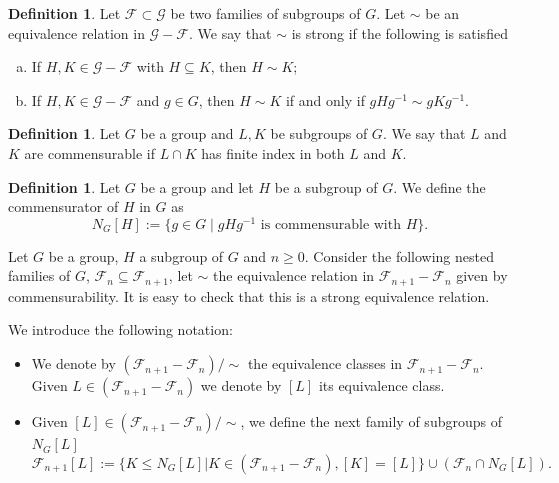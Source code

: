 \documentclass[a4paper,12pt,leqno]{amsart}
\theoremstyle{definition}
\newtheorem{definition}[theorem]{Definition}
\newcommand{\calF}{{\mathcal F}}
\newcommand{\calG}{{\mathcal G}}
\begin{document}
 



 
 \begin{definition}
     
 Let $\calF\subset\calG$ be two families of subgroups of $G$. Let $\sim$ be  an equivalence relation in $\calG-\calF$. We say that $\sim$ is strong  if the following is satisfied 
 
\begin{enumerate}[a)]
    \item If  $H, K \in \calG-\calF$ with $H\subseteq K$, then $H\sim K$;
    \item If $H, K \in \calG-\calF$ and $g\in G$, then $H\sim K$ if and only if $gHg^{-1} \sim gKg^{-1}$.
\end{enumerate}
 \end{definition}
 
 \begin{definition}
     Let $G$ be a group and $L, K$ be subgroups of $G$. We say that $L$ and $K$ are commensurable if $L\cap K$ has finite index in both $L$ and $K$.
 \end{definition}
 
\begin{definition}
Let $G$ be a group and let $H$ be a subgroup of $G$. We define the commensurator of $H$ in $G$ as  $$N_{G}[H]:=\{g\in G \mid gHg^{-1}\text{ is commensurable with }H \}.$$
\end{definition} 


 
 
      Let $G$ be a group, $H$ a subgroup of $G$ and $n\geq0$. Consider the following nested families of $G$,  ${\calF_n}\subseteq {\calF_{n+1}}$, let $\sim$ the equivalence relation in ${\calF_{n+1}}-{\calF_n}$ given by commensurability. It is easy to check that this is a strong equivalence relation.
 
 
We introduce the following notation:
\begin{itemize}
    \item We denote by $({\calF_{n+1}}-{\calF_n})/\sim$ the equivalence classes  in  ${\calF_{n+1}}-{\calF_n}$. Given $L\in ({\calF_{n+1}}-{\calF_n})$ we denote by $[L]$ its equivalence class.
    
    \item Given $[L]\in ({\calF_{n+1}}-{\calF_n})/\sim$, we define the next family of subgroups of  $N_{G}[L]$ $${\calF_{n+1}}[L]:=\{K\leq N_G[L]| K\in  ({\calF_{n+1}}-{\calF_n}), [K]=[L]\}\cup ({\calF_n}\cap N_G[L]).$$
    
\end{itemize}
\end{document}
